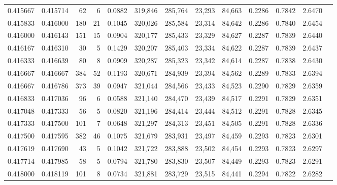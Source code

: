 \begin{tabular}{rrrrrrrrrrrrr}
0.415667 & 0.415714 &    62 &   6 &                                     0.0882 & 319,846 & 285,764 &  23,293 &  84,663 & 0.2286 & 0.7842 & 2.6470 \\
0.415833 & 0.416000 &   180 &  21 &                                     0.1045 & 320,026 & 285,584 &  23,314 &  84,642 & 0.2286 & 0.7840 & 2.6454 \\
0.416000 & 0.416143 &   151 &  15 &                                     0.0904 & 320,177 & 285,433 &  23,329 &  84,627 & 0.2287 & 0.7839 & 2.6440 \\
0.416167 & 0.416310 &    30 &   5 &                                     0.1429 & 320,207 & 285,403 &  23,334 &  84,622 & 0.2287 & 0.7839 & 2.6437 \\
0.416333 & 0.416639 &    80 &   8 &                                     0.0909 & 320,287 & 285,323 &  23,342 &  84,614 & 0.2287 & 0.7838 & 2.6430 \\
0.416667 & 0.416667 &   384 &  52 &                                     0.1193 & 320,671 & 284,939 &  23,394 &  84,562 & 0.2289 & 0.7833 & 2.6394 \\
0.416667 & 0.416786 &   373 &  39 &                                     0.0947 & 321,044 & 284,566 &  23,433 &  84,523 & 0.2290 & 0.7829 & 2.6359 \\
0.416833 & 0.417036 &    96 &   6 &                                     0.0588 & 321,140 & 284,470 &  23,439 &  84,517 & 0.2291 & 0.7829 & 2.6351 \\
0.417048 & 0.417333 &    56 &   5 &                                     0.0820 & 321,196 & 284,414 &  23,444 &  84,512 & 0.2291 & 0.7828 & 2.6345 \\
0.417333 & 0.417500 &   101 &   7 &                                     0.0648 & 321,297 & 284,313 &  23,451 &  84,505 & 0.2291 & 0.7828 & 2.6336 \\
0.417500 & 0.417595 &   382 &  46 &                                     0.1075 & 321,679 & 283,931 &  23,497 &  84,459 & 0.2293 & 0.7823 & 2.6301 \\
0.417619 & 0.417690 &    43 &   5 &                                     0.1042 & 321,722 & 283,888 &  23,502 &  84,454 & 0.2293 & 0.7823 & 2.6297 \\
0.417714 & 0.417985 &    58 &   5 &                                     0.0794 & 321,780 & 283,830 &  23,507 &  84,449 & 0.2293 & 0.7823 & 2.6291 \\
0.418000 & 0.418119 &   101 &   8 &                                     0.0734 & 321,881 & 283,729 &  23,515 &  84,441 & 0.2294 & 0.7822 & 2.6282 \\

\end{tabular}
